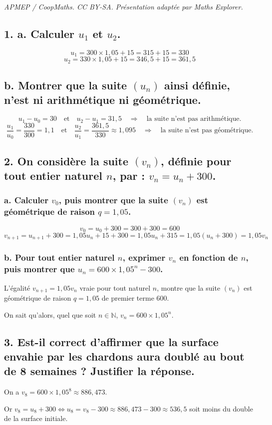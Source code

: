 \documentclass[10pt]{article}
\begin{document}
\noindent\textit{APMEP / CoopMaths. CC BY-SA. Présentation adaptée par Maths Explorer.}\par\medskip
\subsection*{1. a. Calculer $u_1$ et $u_2$.}
	
	\[
	u_1 = 300 \times 1,05 + 15 = 315 + 15 = 330
	\]
	\[
	u_2 = 330 \times 1,05 + 15 = 346,5 + 15 = 361,5
	\]
	
	\subsection*{b. Montrer que la suite $(u_n)$ ainsi définie, n'est ni arithmétique ni géométrique.}
	
	\[
	u_1 - u_0 = 30 \quad \text{et} \quad u_2 - u_1 = 31,5 \quad \Rightarrow \quad \text{la suite n'est pas arithmétique.}
	\]
	\[
	\dfrac{u_1}{u_0} = \dfrac{330}{300} = 1,1 \quad \text{et} \quad \dfrac{u_2}{u_1} = \dfrac{361,5}{330} \approx 1,095 \quad \Rightarrow \quad \text{la suite n'est pas géométrique.}
	\]
	

	
	\subsection*{2. On considère la suite $(v_n)$, définie pour tout entier naturel $n$, par : $v_n = u_n + 300$.}
	
	\subsubsection*{a. Calculer $v_0$, puis montrer que la suite $(v_n)$ est géométrique de raison $q = 1,05$.}
	
	\[
	v_0 = u_0 + 300 = 300 + 300 = 600
	\]
	\[
	v_{n+1} = u_{n+1} + 300 = 1,05u_n + 15 + 300 = 1,05u_n + 315 = 1,05(u_n + 300) = 1,05v_n
	\]
	
	\subsubsection*{b. Pour tout entier naturel $n$, exprimer $v_n$ en fonction de $n$, puis montrer que $u_n = 600 \times 1,05^n - 300$.}
	
	L'égalité $v_{n+1} = 1,05v_n$ vraie pour tout naturel $n$, montre que la suite $(v_n)$ est géométrique de raison $q = 1,05$ de premier terme 600.
	
	On sait qu'alors, quel que soit $n \in \mathbb{N}$, $v_n = 600 \times 1,05^n$.
	
	\subsection*{3. Est-il correct d'affirmer que la surface envahie par les chardons aura doublé au bout de 8 semaines ? Justifier la réponse.}
	
	On a $v_8 = 600 \times 1,05^8 \approx 886,473$.
	
	Or $v_8 = u_8 + 300 \iff u_8 = v_8 - 300 \approx 886,473 - 300 \approx 536,5$ soit moins du double de la surface initiale.
\end{document}
